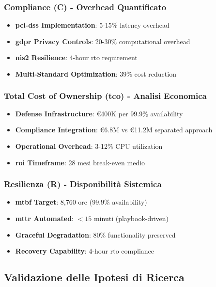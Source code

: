 \subsubsection{Compliance (C) - Overhead Quantificato}
\begin{itemize}
    \item \textbf{\gls{pci-dss} Implementation}: 5-15\% latency overhead
    \item \textbf{\gls{gdpr} Privacy Controls}: 20-30\% computational overhead
    \item \textbf{\gls{nis2} Resilience}: 4-hour \gls{rto} requirement
    \item \textbf{Multi-Standard Optimization}: 39\% cost reduction
\end{itemize}

\subsubsection{Total Cost of Ownership (\gls{tco}) - Analisi Economica}
\begin{itemize}
    \item \textbf{Defense Infrastructure}: €400K per 99.9\% availability
    \item \textbf{Compliance Integration}: €6.8M vs €11.2M separated approach
    \item \textbf{Operational Overhead}: 3-12\% CPU utilization
    \item \textbf{\gls{roi} Timeframe}: 28 mesi break-even medio
\end{itemize}

\subsubsection{Resilienza (R) - Disponibilità Sistemica}
\begin{itemize}
    \item \textbf{\gls{mtbf} Target}: 8,760 ore (99.9\% availability)
    \item \textbf{\gls{mttr} Automated}: $<15$ minuti (playbook-driven)
    \item \textbf{Graceful Degradation}: 80\% functionality preserved
    \item \textbf{Recovery Capability}: 4-hour \gls{rto} compliance
\end{itemize}

\subsection{Validazione delle Ipotesi di Ricerca}
\label{subsec:validazione-ipotesi}

